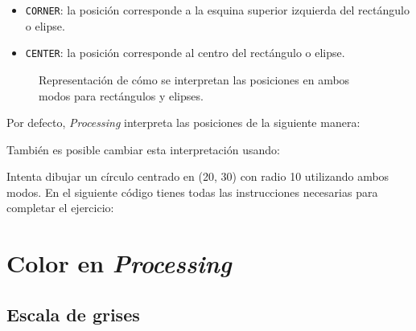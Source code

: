 \documentclass[
  spanish,
  11pt,
  a4paper,
  DIV=11,
  numbers=noendperiod]{scrartcl}
\providecommand{\tightlist}{%
  \setlength{\itemsep}{0pt}\setlength{\parskip}{0pt}}
\begin{document}
\begin{itemize}
\tightlist
\item
  \texttt{CORNER}: la posición corresponde a la esquina superior izquierda del rectángulo o elipse.
\item
  \texttt{CENTER}: la posición corresponde al centro del rectángulo o elipse.
\end{itemize}

\begin{figure}

\caption{\label{fig-rectmodes}Representación de cómo se interpretan las posiciones en ambos modos para rectángulos y elipses.}

\end{figure}%

Por defecto, \emph{Processing} interpreta las posiciones de la siguiente manera:


También es posible cambiar esta interpretación usando:


\begin{tcolorbox}[enhanced jigsaw, toprule=.15mm, coltitle=black, titlerule=0mm, opacitybacktitle=0.6, breakable, colback=white, colframe=quarto-callout-note-color-frame, colbacktitle=quarto-callout-note-color!10!white, opacityback=0, title={Ejercicio 6 - Modo de dibujo}, bottomtitle=1mm, rightrule=.15mm, toptitle=1mm, left=2mm, bottomrule=.15mm, leftrule=.75mm, arc=.35mm]

Intenta dibujar un círculo centrado en (20, 30) con radio 10 utilizando ambos modos. En el siguiente código tienes todas las instrucciones necesarias para completar el ejercicio:


\end{tcolorbox}

\section{\texorpdfstring{Color en \emph{Processing}}{Color en Processing}}

\label{color-en-processing}

\subsection{Escala de grises}
\end{document}
